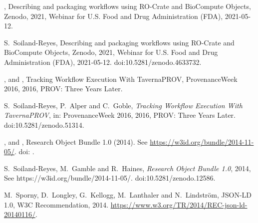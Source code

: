 \documentclass[ds,v1.1.2,openaccess]{iosart2x}%
\begin{document}
\begin{thebibliography}{}
%
\begin{botherref}
,
{Describing and packaging workflows using RO-Crate and BioCompute
Objects}, Zenodo,
2021,
Webinar for U.S. Food and Drug Administration (FDA), 2021-05-12.
\end{botherref}
%
\OrigBibText
S.~Soiland-Reyes,
{Describing and packaging workflows using RO-Crate and BioCompute Objects},
Zenodo,
2021,
{Webinar for U.S. Food and Drug Administration (FDA), 2021-05-12}.
doi:10.5281/zenodo.4633732.
\endOrigBibText
{}
\endbibitem

%
\begin{botherref}
,
 and
,
Tracking Workflow Execution With {TavernaPROV},
{ProvenanceWeek} 2016, 2016, PROV: Three Years Later.
\end{botherref}
%
\OrigBibText
S.~Soiland-Reyes,
P.~Alper and
C.~Goble,
\textit{Tracking Workflow Execution With {TavernaPROV}},
in: {ProvenanceWeek} 2016,
2016,
PROV: Three Years Later.
doi:10.5281/zenodo.51314.
\endOrigBibText
{}
\endbibitem

%
\begin{botherref}
,
 and
,
Research Object Bundle 1.0
(2014).
See \url{https://w3id.org/bundle/2014-11-05/}.
doi: .
\end{botherref}
%
\OrigBibText
S.~Soiland-Reyes,
M.~Gamble and
R.~Haines,
\textit{Research Object Bundle 1.0},
2014,
See https://w3id.org/bundle/2014-11-05/.
doi:10.5281/zenodo.12586.
\endOrigBibText
{}
\endbibitem

%
%
\OrigBibText
M.~Sporny,
D.~Longley,
G.~Kellogg,
M.~Lanthaler and
N.~Lindstr\"{o}m,
{JSON}-{LD} 1.0,
{W3C} Recommendation,
2014.
\url{https://www.w3.org/TR/2014/REC-json-ld-20140116/}.
\endOrigBibText
{}
\endbibitem


\end{thebibliography}
\end{document}
